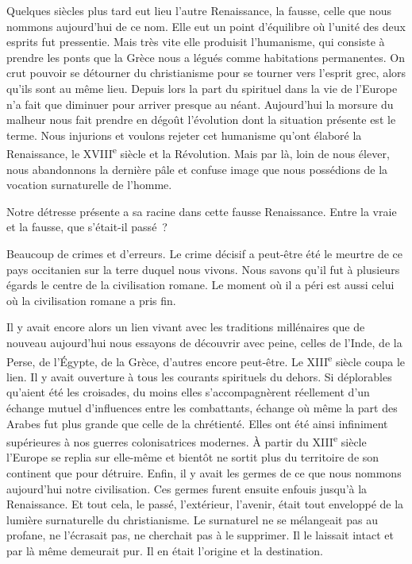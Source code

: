 \documentclass[french,twoside]{book} %
\begin{document}
Quelques siècles plus tard eut lieu l'autre Renaissance, la fausse, celle que nous nommons aujourd'hui de ce nom. Elle eut un point d'équilibre où l'unité des deux esprits fut pressentie. Mais très vite elle produisit l'humanisme, qui consiste à prendre les ponts que la Grèce nous a légués comme habitations permanentes. On crut pouvoir se détourner du christianisme pour se tourner vers l'esprit grec, alors qu'ils sont au même lieu. Depuis lors la part du spiri­tuel dans la vie de l'Europe n'a fait que diminuer pour arriver presque au néant. Aujourd'hui la morsure du malheur nous fait prendre en dégoût l'évolution dont la situation présente est le terme. Nous injurions et voulons rejeter cet humanisme qu'ont élaboré la Renaissance, le XVIII\textsuperscript{e} siècle et la Révolution. Mais par là, loin de nous élever, nous abandonnons la dernière pâle et confuse image que nous possédions de la vocation surnaturelle de l'homme.\par
Notre détresse présente a sa racine dans cette fausse Renaissance. Entre la vraie et la fausse, que s'était-il passé ?\par
Beaucoup de crimes et d'erreurs. Le crime décisif a peut-être été le meurtre de ce pays occitanien sur la terre duquel nous vivons. Nous savons qu'il fut à plusieurs égards le centre de la civilisation romane. Le moment où il a péri est aussi celui où la civilisation romane a pris fin.\par
Il y avait encore alors un lien vivant avec les traditions millénaires que de nouveau aujourd'hui nous essayons de découvrir avec peine, celles de l'Inde, de la Perse, de l'Égypte, de la Grèce, d'autres encore peut-être. Le XIII\textsuperscript{e} siècle coupa le lien. Il y avait ouverture à tous les courants spirituels du dehors. Si déplorables qu'aient été les croisades, du moins elles s'accompagnèrent réellement d'un échange mutuel d'influences entre les combattants, échange où même la part des Arabes fut plus grande que celle de la chrétienté. Elles ont été ainsi infiniment supérieures à nos guerres colonisatrices modernes. À partir du XIII\textsuperscript{e} siècle l'Europe se replia sur elle-même et bientôt ne sortit plus du territoire de son continent que pour détruire. Enfin, il y avait les germes de ce que nous nommons aujourd'hui notre civilisation. Ces germes furent ensui­te enfouis jusqu'à la Renaissance. Et tout cela, le passé, l'extérieur, l'avenir, était tout enveloppé de la lumière surnaturelle du christianisme. Le surnaturel ne se mélangeait pas au profane, ne l'écrasait pas, ne cherchait pas à le supprimer. Il le laissait intact et par là même demeurait pur. Il en était l'origine et la destination.\par
\end{document}
